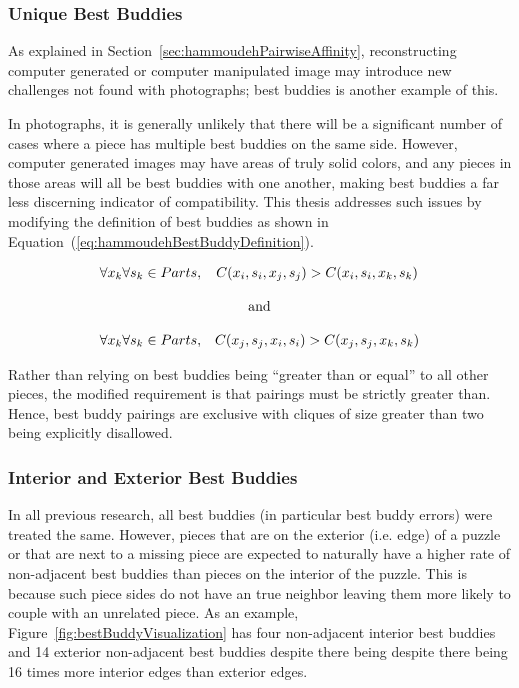 \documentclass{report}
\def\eref#1{(\ref{#1})}
\begin{document}
\subsubsection{Unique Best Buddies}\label{sec:improvedBestBuddies}

As explained in Section~\ref{sec:hammoudehPairwiseAffinity}, reconstructing computer generated or computer manipulated image may introduce new challenges not found with photographs; best buddies is another example of this.

In photographs, it is generally unlikely that there will be a significant number of cases where a piece has multiple best buddies on the same side.  However, computer generated images may have areas of truly solid colors, and any pieces in those areas will all be best buddies with one another, making best buddies a far less discerning indicator of compatibility.  This thesis addresses such issues by modifying the definition of best buddies as shown in Equation~\eref{eq:hammoudehBestBuddyDefinition}.

\begin{equation} \label{eq:hammoudehBestBuddyDefinition}
\begin{split}
\begin{matrix}
\forall{x_k} \forall{s_k} \in Parts, & C(x_i, s_i, x_j, s_j) > C(x_i, s_i, x_k, s_k)
\\
\\
\multicolumn{2}{c}{\textnormal{and}}
\\
\\
\forall{x_k} \forall{s_k} \in Parts, & C(x_j, s_j, x_i, s_i) > C(x_j, s_j, x_k, s_k)
\end{matrix}
\end{split}
\end{equation}

Rather than relying on best buddies being ``greater than or equal'' to all other pieces, the modified requirement is that pairings must be strictly greater than.  Hence, best buddy pairings are exclusive with cliques of size greater than two being explicitly disallowed.

\subsubsection{Interior and Exterior Best Buddies}\label{sec:interiorExteriorBestBuddies}

In all previous research, all best buddies (in particular best buddy errors) were treated the same.  However, pieces that are on the exterior (i.e. edge) of a puzzle or that are next to a missing piece are expected to naturally have a higher rate of non-adjacent best buddies than pieces on the interior of the puzzle.  This is because such piece sides do not have an true neighbor leaving them more likely to couple with an unrelated piece.  As an example, Figure~\ref{fig:bestBuddyVisualization} has four non-adjacent interior best buddies and 14 exterior non-adjacent best buddies despite there being despite there being 16 times more interior edges than exterior edges. 
\end{document}
